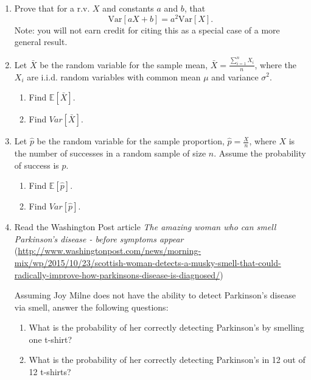 \documentclass[12pt]{article}
\begin{document}
\begin{enumerate}
\item  \label{Ch12_Var_linear_combo} Prove that for a r.v. $X$ and constants $a$ and $b$, that $$\mathrm{Var}[aX+b]=a^2\mathrm{Var}[X].$$ Note: you will not earn credit for citing this as a special case of a more general result.

\item \label{Ch12_Xbar} Let $\bar{X}$ be the random variable for the sample mean, $\bar{X}=\frac{\sum_{i=1}^nX_i}{n}$, where the $X_i$ are i.i.d. random variables with common mean $\mu$ and variance $\sigma^2$.
	\begin{enumerate}
	\item Find $\mathbb{E}[\bar{X}]$.
	\item Find $Var[\bar{X}]$.
	\end{enumerate}

\item \label{Ch12_p_hat} Let $\hat{p}$ be the random variable for the sample proportion, $\hat{p}=\frac{X}{n}$, where $X$ is the number of successes in a random sample of size $n$. Assume the probability of success is $p$.
	\begin{enumerate}
	\item Find $\mathbb{E}[\hat{p}]$.
	\item Find $Var[\hat{p}]$.
	\end{enumerate}



\item \label{ParkinsonsBinom} Read the Washington Post article \emph{The amazing woman who can smell Parkinson's disease - before symptoms appear}
(\url{http://www.washingtonpost.com/news/morning-mix/wp/2015/10/23/scottish-woman-detects-a-musky-smell-that-could-radically-improve-how-parkinsons-disease-is-diagnosed/})

\medskip

Assuming Joy Milne does not have the ability to detect Parkinson's disease via smell, answer the following questions: 
	\begin{enumerate}
	\item What is the probability of her correctly detecting Parkinson's by smelling one t-shirt?
	\item What is the probability of her correctly detecting Parkinson's in 12 out of 12 t-shirts?
	\end{enumerate}



\end{enumerate}
\end{document}
